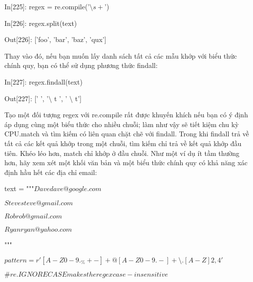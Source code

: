 \hspace{1cm}In\hspace{3mm}[225]:\hspace{3mm} regex = re.compile('$\setminus s+$') \par
\hspace{1cm}In\hspace{3mm}[226]:\hspace{3mm} regex.split(text) \par
\hspace{1cm}Out[226]:\hspace{3mm} ['foo', 'bar', 'baz', 'qux'] \par
Thay vào đó, nếu bạn muốn lấy danh sách tất cả các mẫu khớp với biểu thức chính quy, bạn có thể sử dụng phương thức findall:\par
\hspace{1cm}In\hspace{3mm}[227]:\hspace{3mm} regex.findall(text)\par
\hspace{1cm}Out[227]:\hspace{3mm} [' ', '$\setminus$ t ', ' $\setminus$ t'] \par
Tạo một đối tượng regex với re.compile rất được khuyến khích nếu bạn có ý định áp dụng cùng một biểu thức cho nhiều chuỗi; làm như vậy sẽ tiết kiệm chu kỳ CPU.match và tìm kiếm có liên quan chặt chẽ với findall. Trong khi findall trả về tất cả các kết quả khớp trong một chuỗi, tìm kiếm chỉ trả về kết quả khớp đầu tiên. Khéo léo hơn, match chỉ khớp ở đầu chuỗi. Như một ví dụ ít tầm thường hơn, hãy xem xét một khối văn bản và một biểu thức chính quy có khả năng xác định hầu hết các địa chỉ email:\par
\hspace{1cm}text = """$Dave dave@google.com$ \par
\hspace{1cm}$Steve steve@gmail.com$ \par
\hspace{1cm}$Rob rob@gmail.com$ \par
\hspace{1cm}$Ryan ryan@yahoo.com$ \par
\hspace{1cm}""" \par
\hspace{1cm}$pattern = r'[A-Z0-9._\%+-]+@[A-Z0-9.-]+\setminus .[A-Z]{2,4}'$\par
\hspace{1cm}$\# re.IGNORECASE makes the regex case-insensitive$\par
